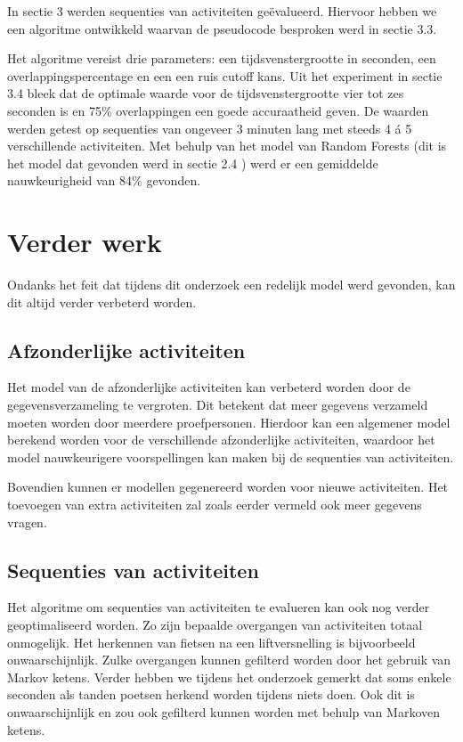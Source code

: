\documentclass{article}
\begin{document}
	In sectie 3 werden sequenties van activiteiten ge\"evalueerd. Hiervoor hebben we een algoritme ontwikkeld waarvan de pseudocode besproken werd in sectie 3.3. 

Het algoritme vereist drie parameters: een tijdsvenstergrootte in seconden, een overlappingspercentage en een een ruis cutoff kans. Uit het experiment in sectie 3.4
bleek dat de optimale waarde voor de tijdsvenstergrootte vier tot zes seconden is en 75\% overlappingen een goede accuraatheid geven. De waarden werden getest op sequenties van ongeveer 3 minuten lang met steeds 4 \'a 5 verschillende activiteiten. Met behulp van het model van Random Forests (dit is het model dat gevonden werd in sectie 2.4
) werd er een gemiddelde nauwkeurigheid van 84\% gevonden.



\section{Verder werk}

Ondanks het feit dat tijdens dit onderzoek een redelijk model werd gevonden, kan dit altijd verder verbeterd worden.

\subsection{Afzonderlijke activiteiten}

Het model van de afzonderlijke activiteiten kan verbeterd worden door de gegevensverzameling te vergroten. Dit betekent dat meer gegevens verzameld moeten worden door meerdere proefpersonen. Hierdoor kan een algemener model berekend worden voor de verschillende afzonderlijke activiteiten, waardoor het model nauwkeurigere voorspellingen kan maken bij de sequenties van activiteiten.

Bovendien kunnen er modellen gegenereerd worden voor nieuwe activiteiten. Het toevoegen van extra activiteiten zal zoals eerder vermeld ook meer gegevens vragen.

\subsection{Sequenties van activiteiten}

Het algoritme om sequenties van activiteiten te evalueren kan ook nog verder geoptimaliseerd worden. 
Zo zijn bepaalde overgangen van activiteiten totaal onmogelijk. Het herkennen van fietsen na een liftversnelling is bijvoorbeeld onwaarschijnlijk. Zulke overgangen kunnen gefilterd worden door het gebruik van Markov ketens. Verder hebben we tijdens het onderzoek gemerkt dat soms enkele seconden als tanden poetsen herkend worden tijdens niets doen. Ook dit is onwaarschijnlijk en zou ook gefilterd kunnen worden met behulp van Markoven ketens.
\end{document}
